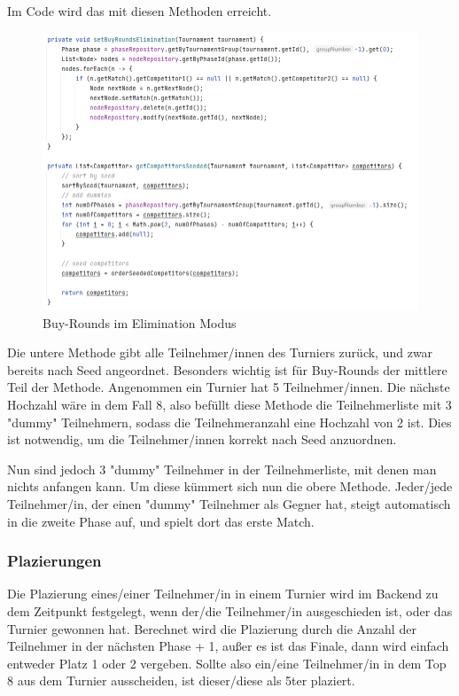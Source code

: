Im Code wird das mit diesen Methoden erreicht.

\begin{figure}[H]
    \includegraphics[scale=0.65]{pics/backend/elimination/elimination_setBuyRounds.png}
    \caption{Buy-Rounds im Elimination Modus}
\end{figure}

Die untere Methode gibt alle Teilnehmer/innen des Turniers zurück, und zwar bereits nach Seed angeordnet. Besonders wichtig ist für Buy-Rounds der mittlere Teil der Methode. Angenommen ein Turnier hat 5 Teilnehmer/innen. 
Die nächste Hochzahl wäre in dem Fall 8, also befüllt diese Methode die Teilnehmerliste mit 3 "dummy" Teilnehmern, sodass die Teilnehmeranzahl eine Hochzahl von 2 ist. Dies ist notwendig, um die Teilnehmer/innen korrekt 
nach Seed anzuordnen. 

Nun sind jedoch 3 "dummy" Teilnehmer in der Teilnehmerliste, mit denen man nichts anfangen kann. Um diese kümmert sich nun die obere Methode. Jeder/jede Teilnehmer/in, der einen "dummy" Teilnehmer als Gegner hat, 
steigt automatisch in die zweite Phase auf, und spielt dort das erste Match.

\subsubsection{Plazierungen}

Die Plazierung eines/einer Teilnehmer/in in einem Turnier wird im Backend zu dem Zeitpunkt festgelegt, wenn der/die Teilnehmer/in ausgeschieden ist, oder 
das Turnier gewonnen hat. Berechnet wird die Plazierung durch die Anzahl der Teilnehmer in der nächsten Phase + 1, außer es ist das Finale, dann wird einfach entweder Platz 1 oder 2 vergeben. 
Sollte also ein/eine Teilnehmer/in in dem Top 8 aus dem Turnier ausscheiden, ist dieser/diese als 5ter plaziert.

